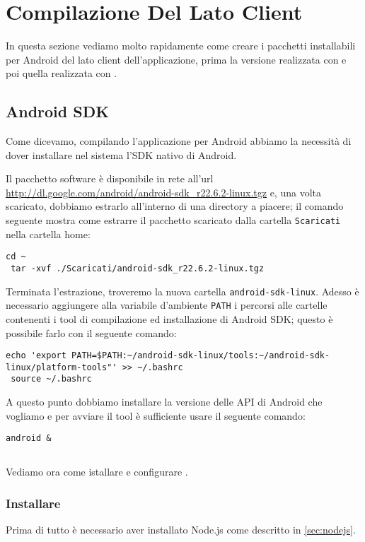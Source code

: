 \chapter{Compilazione Del Lato Client}

In questa sezione vediamo molto rapidamente come creare i pacchetti installabili
per Android del lato client dell'applicazione, prima la versione realizzata con
\pg{} e poi quella realizzata con \tisdk{}.

\section{Android SDK}
    Come dicevamo, compilando l'applicazione per Android abbiamo la necessità di
    dover installare nel sistema l'SDK nativo di Android.
    
    Il pacchetto software è disponibile in rete all'url
    \url{http://dl.google.com/android/android-sdk_r22.6.2-linux.tgz} e, una
    volta scaricato, dobbiamo estrarlo all'interno di una directory a piacere;
    il comando seguente mostra come estrarre il pacchetto scaricato dalla 
    cartella \texttt{Scaricati} nella cartella home:
    \begin{lstlisting}[language=plane]
 cd ~
 tar -xvf ./Scaricati/android-sdk_r22.6.2-linux.tgz
    \end{lstlisting}
    Terminata l'estrazione, troveremo la nuova cartella
    \texttt{android-sdk-linux}. Adesso è necessario aggiungere alla 
    variabile d'ambiente \texttt{PATH} i percorsi alle cartelle contenenti i 
    tool di compilazione ed installazione di Android SDK; questo è possibile 
    farlo con il seguente comando:
    \begin{lstlisting}[language=plane]
 echo 'export PATH=$PATH:~/android-sdk-linux/tools:~/android-sdk-linux/platform-tools"' >> ~/.bashrc
 source ~/.bashrc
    \end{lstlisting}
    A questo punto dobbiamo installare la versione delle API di Android che 
    vogliamo e per avviare il tool è sufficiente usare il seguente comando:
    \begin{lstlisting}[language=plane]
    android &
    \end{lstlisting}
     

\section{\pg{}}
    Vediamo ora come istallare e configurare \pg{}.
    
    \subsection{Installare \pg{}}
        Prima di tutto è necessario aver installato Node.js come descritto in 
        \ref{sec:nodejs}.
        
